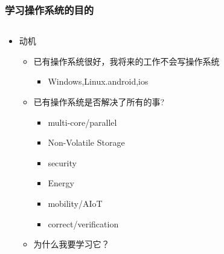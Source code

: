 \documentclass[UTF8]{ctexbeamer}
\begin{document}
\begin{frame}
    \frametitle{学习操作系统的目的}
    \begin{columns}[t]
    \begin{column}{0.5\textwidth}
    \begin{itemize}
    \item 动机
    \begin{itemize}
    \item 已有操作系统很好，我将来的工作不会写操作系统
    \begin{itemize}
        \item Windows,Linux.android,ios
    \end{itemize}
    \item 已有操作系统是否解决了所有的事?
        \begin{itemize}
        \item multi-core/parallel
        \item Non-Volatile Storage
        \item security
        \item Energy
        \item mobility/AIoT
        \item correct/verification
        \end{itemize}
    \item 为什么我要学习它？
       \end{itemize}
    \end{itemize}
     \end{column}
     

\end{columns}
\end{frame}
\end{document}
